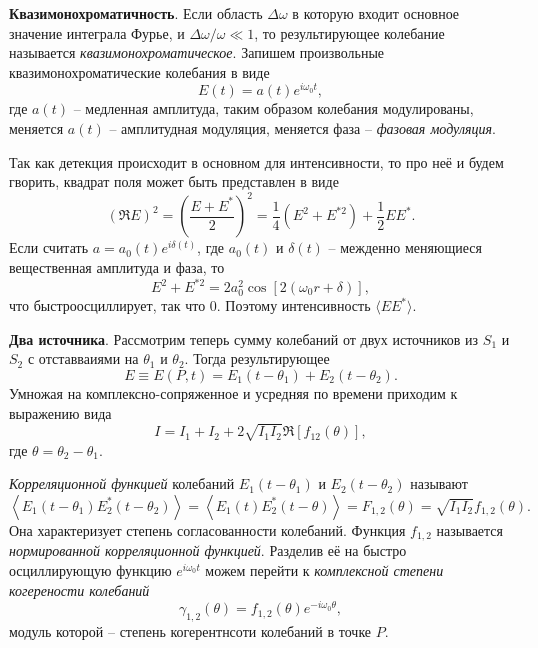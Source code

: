 

\textbf{Квазимонохроматичность}. 
Если область $\Delta \omega$ в которую входит 
 основное значение интеграла Фурье, и $\Delta \omega / \omega \ll 1$, то результирующее колебание называется \textit{квазимонохроматическое}. Запишем произвольные квазимонохроматические колебания в виде
\begin{equation*}
    E(t) = a(t) e^{i \omega_0 t},
\end{equation*}
где $a(t)$ -- медленная амплитуда, таким образом колебания модулированы, меняется $a(t)$ -- амплитудная модуляция, меняется фаза -- \textit{фазовая модуляция}. 


Так как детекция происходит в основном для интенсивности, то про неё и будем гворить, квадрат поля может быть представлен в виде
\begin{equation*}
    (\Re E)^2 = \left(\frac{E + E^*}{2}\right)^2 = \frac{1}{4} \left(E^2 + E^{*2}\right) + \frac{1}{2} E E^*.
\end{equation*}
Если считать $a = a_0 (t) e^{i \delta(t)}$, где $a_0(t)$ и $\delta(t)$ -- межденно меняющиеся вещественная амплитуда и фаза, то
\begin{equation*}
    E^2 + E^{*2} = 2 a_0^2 \cos\left[2(\omega_0 r + \delta)\right],
\end{equation*}
что быстроосциллирует, так что $0$. Поэтому интенсивность $\langle E E^*\rangle$. 



\textbf{Два источника}.
Рассмотрим теперь сумму колебаний от двух источников из $S_1$ и $S_2$ с отставваиями на $\theta_1$ и $\theta_2$. Тогда результирующее 
\begin{equation*}
    E \equiv E(P, t) = E_1(t-\theta_1) + E_2 (t-\theta_2).
\end{equation*}
Умножая на комплексно-сопряженное и усредняя по времени приходим к выражению вида
\begin{equation*}
    I = I_1 + I_2 + 2 \sqrt{I_1 I_2} \Re\left[f_{12}(\theta)\right],
\end{equation*}
где $\theta = \theta_2-\theta_1$. 

\begin{to_def}
    \textit{Корреляционной функцией} колебаний $E_1(t-\theta_1)$ и $E_2(t-\theta_2)$ называют 
    \begin{equation*}
        \left\langle 
            E_1(t-\theta_1) E_2^* (t-\theta_2)
        \right\rangle = \left\langle E_1(t) E_2^* (t-\theta)\right\rangle = F_{1, 2}(\theta) = \sqrt{I_1 I_2}f_{1,2} (\theta).
    \end{equation*}
    Она характеризует степень согласованности колебаний. Функция $f_{1, 2}$ называется \textit{нормированной корреляционной функцией}. Разделив её на быстро осциллирующую функцию $e^{i \omega_0 t}$ можем перейти к \textit{комплексной степени когерености колебаний}
    \begin{equation*}
        \gamma_{1,2}(\theta) = f_{1, 2} (\theta) e^{-i \omega_0 \theta},
    \end{equation*}
    модуль которой -- степень когерентнсоти колебаний в точке $P$. 
\end{to_def}



